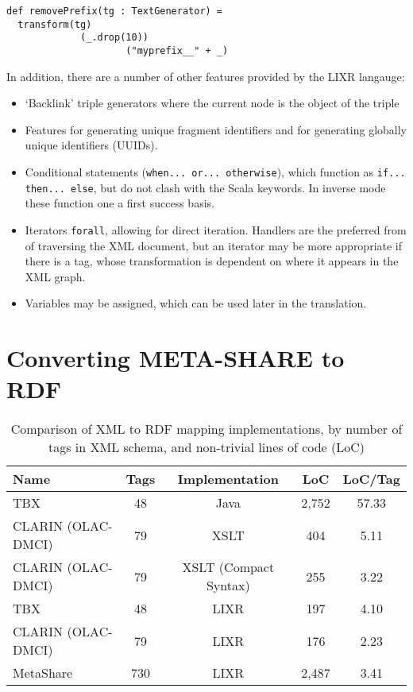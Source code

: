 \documentclass{acm_proc_article-sp}
\begin{document}
\begin{verbatim}
def removePrefix(tg : TextGenerator) =
  transform(tg)
	         (_.drop(10))
					 ("myprefix__" + _) 
\end{verbatim}

In addition, there are a number of other features provided by the LIXR langauge:

\begin{itemize}
\item `Backlink' triple generators where the current node is the object of the triple
\item Features for generating unique fragment identifiers and for generating globally unique 
identifiers (UUIDs).
\item Conditional statements ({\tt when... or... otherwise}), which function as
{\tt if... then... else}, but do not clash with the Scala keywords. In inverse mode
these function one a first success basis.
\item Iterators {\tt forall}, allowing for direct iteration. Handlers are the 
preferred from of traversing the XML document, but an iterator may be more appropriate 
if there is a tag, whose transformation is dependent on where it appears in the
XML graph.
\item Variables may be assigned, which can be used later in the translation.
\end{itemize}

\section{Converting META-SHARE to RDF}
\label{sec:metashare}
\begin{table*}
\begin{center}
\begin{tabular}{p{4cm}|cccc}
Name & Tags & Implementation & LoC & LoC/Tag \\
\hline
TBX & 48 & Java & 2,752 & 57.33 \\
CLARIN (OLAC-DMCI) & 79 & XSLT & 404 & 5.11 \\
CLARIN (OLAC-DMCI) & 79 & XSLT (Compact Syntax) & 255 & 3.22 \\
\hline
TBX & 48 & LIXR & 197 & 4.10 \\
CLARIN (OLAC-DMCI) & 79 & LIXR & 176 & 2.23 \\
MetaShare & 730 & LIXR & 2,487 & 3.41 \\
\end{tabular}
\end{center}
\caption{\label{tab:locs}Comparison of XML to RDF mapping implementations,
by number of tags in XML schema, and non-trivial lines of code (LoC)}
\end{table*}
\end{document}
